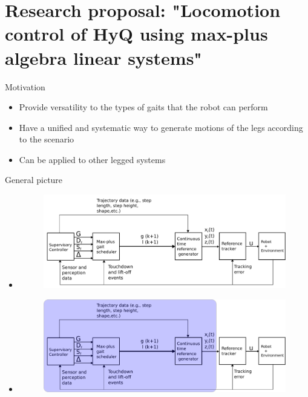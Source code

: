 \documentclass{beamer}
\begin{document}
\section{Research proposal: "Locomotion control of HyQ using max-plus algebra linear systems"}

\begin{frame}{Motivation}
	\begin{itemize}\setlength\itemsep{3em}
		\item Provide versatility to the types of gaits that the robot can perform
		\item Have a unified and systematic way to generate motions of the legs according to the scenario
		\item Can be applied to other legged systems
	\end{itemize}
\end{frame}

\begin{frame}{General picture}	
	\begin{itemize}[notitemsep, topsep=0pt]
		\item <1|only@1> [] 
		\begin{figure}[ht]\centering
			\hspace{-25pt}\includegraphics[width=1\textwidth]{images/ControlStrategy.pdf}
		\end{figure}
		\item <2|only@2> [] 
		\begin{figure}[ht]\centering
			\hspace{-25pt}\includegraphics[width=1\textwidth]{images/ControlStrategy1.pdf}
		\end{figure}
	\end{itemize}
\end{frame}
\end{document}
